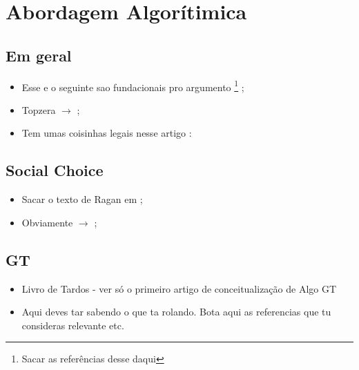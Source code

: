 \documentclass{article}
\begin{document}
\section{Abordagem Algorítimica}

\subsection{Em geral}

\begin{itemize}
\item Esse e o seguinte sao fundacionais pro
  argumento \textcite{sep-social-procedures} \footnote{Sacar as referências desse
    daqui} ;
\item Topzera \(\rightarrow \) \textcite{eijck2009discourses}; 
\item Tem umas coisinhas legais nesse artigo : \textcite{page2008uncertainty}
\end{itemize}


\subsection{Social Choice}
\begin{itemize}
\item Sacar o texto de Ragan em \textcite{heckelman2015handbook};
\item Obviamente \(\rightarrow\) \textcite{brandt2016handbook};
\end{itemize}

\subsection{GT}
\begin{itemize}
\item Livro de Tardos - ver só o primeiro artigo de conceitualização de Algo GT \textcite{nisan2007algorithmic}
\end{itemize}

\begin{itemize}
\item Aqui deves tar sabendo o que ta rolando. Bota aqui as referencias que tu
  consideras relevante etc. 
\end{itemize}



\printbibliography
\end{document}
